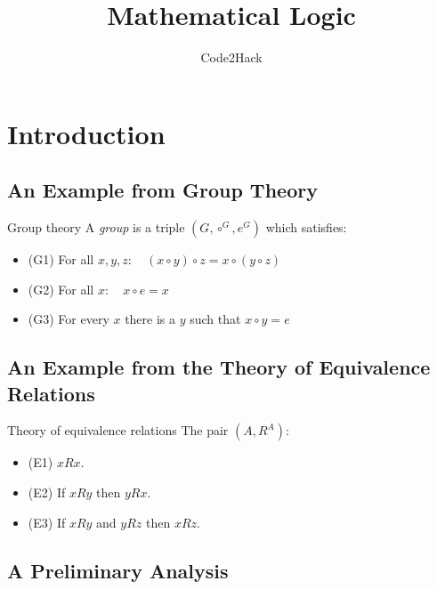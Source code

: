 \documentclass{article}
\title{Mathematical Logic}
\author{Code2Hack}
\begin{document}
\maketitle
\tableofcontents
\newpage

\section{Introduction}
\subsection{An Example from Group Theory}

\begin{axiom}{Group theory}
    A {\it group} is a triple $(G, \circ^G, e^G)$ which satisfies:
    \begin{itemize}
        \item (G1) For all $x,y,z: \quad (x \circ y) \circ z = x \circ (y \circ z)$
        \item (G2) For all $x: \quad x \circ e = x$
        \item (G3) For every $x$ there is a $y$ such that $x \circ y = e$
    \end{itemize}
\end{axiom}

\subsection{An Example from the Theory of Equivalence Relations}

\begin{axiom}{Theory of equivalence relations}
    The pair $(A, R^A)$:
    \begin{itemize}
        \item (E1) $xRx$.
        \item (E2) If $xRy$ then $yRx$.
        \item (E3) If $xRy$ and $yRz$ then $xRz$.
    \end{itemize}
\end{axiom}

\subsection{A Preliminary Analysis}
\end{document}
